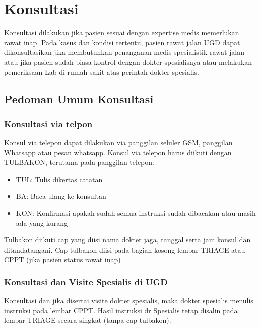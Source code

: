 \documentclass[
]{book}
\providecommand{\tightlist}{%
  \setlength{\itemsep}{0pt}\setlength{\parskip}{0pt}}
\begin{document}
\hypertarget{konsultasi}{%
\chapter{Konsultasi}\label{konsultasi}}

Konsultasi dilakukan jika pasien sesuai dengan expertise medis memerlukan rawat inap. Pada kasus dan kondisi tertentu, pasien rawat jalan UGD dapat dikonsultasikan jika membutuhkan penanganan medis spesialistik rawat jalan atau jika pasien sudah biasa kontrol dengan dokter spesialisnya atau melakukan pemeriksaan Lab di rumah sakit atas perintah dokter spesialis.

\hypertarget{pedoman-umum-konsultasi}{%
\section{Pedoman Umum Konsultasi}\label{pedoman-umum-konsultasi}}

\hypertarget{konsultasi-via-telpon}{%
\subsection{Konsultasi via telpon}\label{konsultasi-via-telpon}}

Konsul via telepon dapat dilakukan via panggilan seluler GSM, panggilan Whatsapp atau pesan whatsapp.
Konsul via telepon harus diikuti dengan TULBAKON, terutama pada panggilan telepon.

\begin{itemize}
\tightlist
\item
  TUL: Tulis dikertas catatan
\item
  BA: Baca ulang ke konsultan
\item
  KON: Konfirmasi apakah sudah semua instruksi sudah dibacakan atau masih ada yang kurang
\end{itemize}

Tulbakon diikuti cap yang diisi nama dokter jaga, tanggal serta jam konsul dan ditandatangani.
Cap tulbakon diisi pada bagian kosong lembar TRIAGE atau CPPT (jika pasien status rawat inap)

\hypertarget{konsultasi-dan-visite-spesialis-di-ugd}{%
\subsection{Konsultasi dan Visite Spesialis di UGD}\label{konsultasi-dan-visite-spesialis-di-ugd}}

Konsultasi dan jika disertai visite dokter spesialis, maka dokter spesialis menulis instruksi pada lembar CPPT. Hasil instruksi dr Spesialis tetap disalin pada lembar TRIAGE secara singkat (tanpa cap tulbakon).
\end{document}
